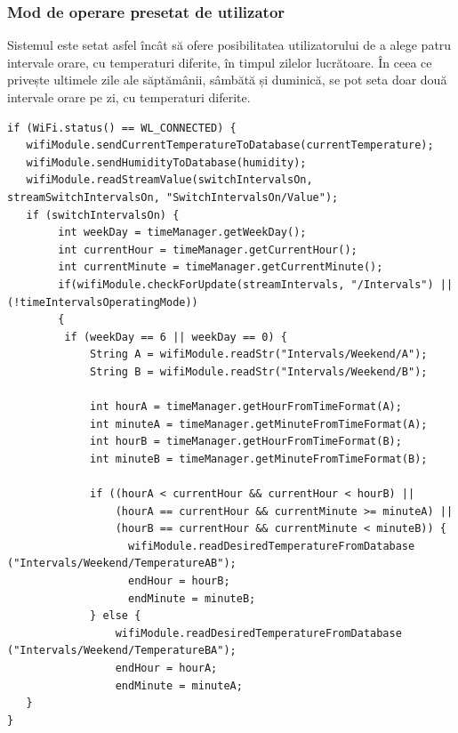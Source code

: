 \subsubsection{Mod de operare presetat de utilizator}

	Sistemul este setat asfel încât să ofere posibilitatea utilizatorului de a alege patru intervale orare, cu temperaturi diferite, în timpul zilelor lucrătoare. În ceea ce privește ultimele zile ale săptămânii, sâmbătă și duminică, se pot seta doar două intervale orare pe zi, cu temperaturi diferite.


\vspace{1em}

\begin{lstlisting}
if (WiFi.status() == WL_CONNECTED) {
   wifiModule.sendCurrentTemperatureToDatabase(currentTemperature);
   wifiModule.sendHumidityToDatabase(humidity);
   wifiModule.readStreamValue(switchIntervalsOn, streamSwitchIntervalsOn, "SwitchIntervalsOn/Value");
   if (switchIntervalsOn) {
        int weekDay = timeManager.getWeekDay();
        int currentHour = timeManager.getCurrentHour();
        int currentMinute = timeManager.getCurrentMinute();
        if(wifiModule.checkForUpdate(streamIntervals, "/Intervals") || (!timeIntervalsOperatingMode))
        {
         if (weekDay == 6 || weekDay == 0) {
             String A = wifiModule.readStr("Intervals/Weekend/A");
             String B = wifiModule.readStr("Intervals/Weekend/B");

             int hourA = timeManager.getHourFromTimeFormat(A);
             int minuteA = timeManager.getMinuteFromTimeFormat(A);
             int hourB = timeManager.getHourFromTimeFormat(B);
             int minuteB = timeManager.getMinuteFromTimeFormat(B);

             if ((hourA < currentHour && currentHour < hourB) ||
                 (hourA == currentHour && currentMinute >= minuteA) ||
                 (hourB == currentHour && currentMinute < minuteB)) {
                   wifiModule.readDesiredTemperatureFromDatabase ("Intervals/Weekend/TemperatureAB");
                   endHour = hourB;
                   endMinute = minuteB;
             } else {
                 wifiModule.readDesiredTemperatureFromDatabase ("Intervals/Weekend/TemperatureBA");
                 endHour = hourA;
                 endMinute = minuteA;       
   }
} 
\end{lstlisting}

\vspace{2em}	

